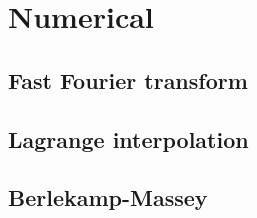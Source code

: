 \section{Numerical}

\subsection{Fast Fourier transform}

\subsection{Lagrange interpolation}

\subsection{Berlekamp-Massey}
